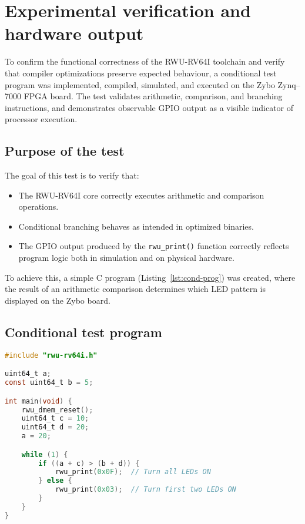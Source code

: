 \section{Experimental verification and hardware output}
\label{sec:optim-verify}

To confirm the functional correctness of the RWU-RV64I toolchain and verify that compiler optimizations preserve expected behaviour, a conditional test program was implemented, compiled, simulated, and executed on the Zybo Zynq--7000 FPGA board.  
The test validates arithmetic, comparison, and branching instructions, and demonstrates observable GPIO output as a visible indicator of processor execution.

\subsection{Purpose of the test}
The goal of this test is to verify that:
\begin{itemize}
  \item The RWU-RV64I core correctly executes arithmetic and comparison operations.
  \item Conditional branching behaves as intended in optimized binaries.
  \item The GPIO output produced by the \texttt{rwu\_print()} function correctly reflects program logic both in simulation and on physical hardware.
\end{itemize}

To achieve this, a simple C program (Listing~\ref{lst:cond-prog}) was created, where the result of an arithmetic comparison determines which LED pattern is displayed on the Zybo board.

\subsection{Conditional test program}
\begin{lstlisting}[language=C, caption={Conditional LED control program for RWU-RV64I verification.}, label={lst:cond-prog}]
#include "rwu-rv64i.h"

uint64_t a;
const uint64_t b = 5;

int main(void) {
    rwu_dmem_reset();
    uint64_t c = 10;
    uint64_t d = 20;
    a = 20;

    while (1) {
        if ((a + c) > (b + d)) {
            rwu_print(0x0F);  // Turn all LEDs ON
        } else {
            rwu_print(0x03);  // Turn first two LEDs ON
        }
    }
}
\end{lstlisting}

